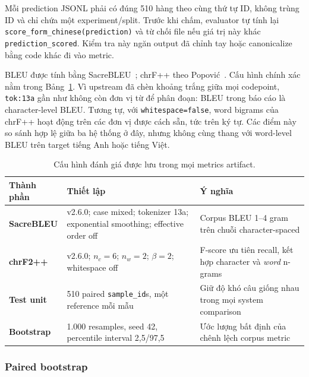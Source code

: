 Mỗi prediction JSONL phải có đúng 510 hàng theo cùng thứ tự ID, không trùng ID
và chỉ chứa một experiment/split. Trước khi chấm, evaluator tự tính lại
\texttt{score\_form\_\allowbreak chinese(prediction)} và từ chối file nếu giá trị này khác
\texttt{prediction\_scored}. Kiểm tra này ngăn output đã chỉnh tay hoặc
canonicalize bằng code khác đi vào metric.

BLEU được tính bằng SacreBLEU~\cite{papineni2002bleu,post2018sacrebleu}; chrF++
theo Popovi\'c~\cite{popovic2017chrfpp}. Cấu hình chính xác nằm trong
Bảng~\ref{tab:metrics}. Vì upstream đã chèn khoảng trắng giữa mọi codepoint,
\texttt{tok:13a} gần như không còn đơn vị từ để phân đoạn: BLEU trong báo cáo
là character-level BLEU. Tương tự, với \texttt{whitespace=false}, word
bigrams của chrF++ hoạt động trên các đơn vị được cách sẵn, tức trên ký tự.
Các điểm này so sánh hợp lệ giữa ba hệ thống ở đây, nhưng không cùng thang với
word-level BLEU trên target tiếng Anh hoặc tiếng Việt.

\begin{table}[tbp]
  \centering
  \small
  \renewcommand{\arraystretch}{1.18}
  \caption{Cấu hình đánh giá được lưu trong mọi metrics artifact.}
  \label{tab:metrics}
  \begin{tabularx}{\textwidth}{@{}>{\bfseries}p{2.5cm}p{4.7cm}X@{}}
    \toprule
    Thành phần & Thiết lập & Ý nghĩa \\
    \midrule
    SacreBLEU
      & v2.6.0; case mixed; tokenizer 13a; exponential smoothing; effective order off
      & Corpus BLEU 1--4 gram trên chuỗi character-spaced \\
    chrF2++
      & v2.6.0; $n_c=6$; $n_w=2$; $\beta=2$; whitespace off
      & F-score ưu tiên recall, kết hợp character và \emph{word} n-grams \\
    Test unit
      & 510 paired \texttt{sample\_id}s, một reference mỗi mẫu
      & Giữ độ khó câu giống nhau trong mọi system comparison \\
    Bootstrap
      & 1.000 resamples, seed 42, percentile interval 2,5/97,5
      & Ước lượng bất định của chênh lệch corpus metric \\
    \bottomrule
  \end{tabularx}
\end{table}

\subsubsection{Paired bootstrap}

